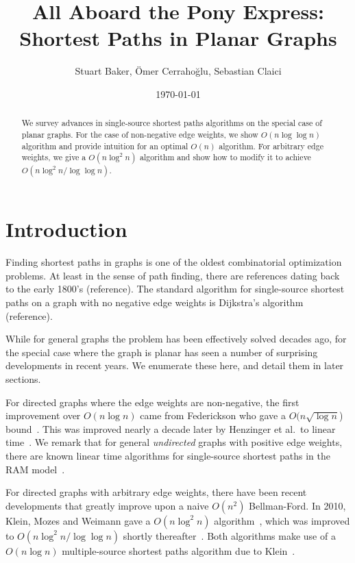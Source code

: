 \documentclass[12pt]{article}
\title{All Aboard the Pony Express:\\ Shortest Paths in Planar Graphs}
\author{Stuart Baker, \"{O}mer Cerraho\u{g}lu, Sebastian Claici}
\date{\today}
\begin{document}
\maketitle

\begin{abstract}
  We survey advances in single-source shortest paths algorithms on the special case of planar graphs. For the case of non-negative edge weights, we show $O(n\log \log n)$ algorithm and provide intuition for an optimal $O(n)$ algorithm. For arbitrary edge weights, we give a $O(n\log^2 n)$ algorithm and show how to modify it to achieve $O(n\log^2 n/\log \log n)$.
\end{abstract}

\section{Introduction}
\label{sec:introduction}

Finding shortest paths in graphs is one of the oldest combinatorial optimization problems. At least in the sense of path finding, there are references dating back to the early 1800's (reference). The standard algorithm for single-source shortest paths on a graph with no negative edge weights is Dijkstra's algorithm (reference).

While for general graphs the problem has been effectively solved decades ago, for the special case where the graph is planar has seen a number of surprising developments in recent years. We enumerate these here, and detail them in later sections.

For directed graphs where the edge weights are non-negative, the first improvement over $O(n\log n)$ came from Federickson who gave a $O(n \sqrt{\log n}$) bound~\cite{federickson1987fast}. This was improved nearly a decade later by Henzinger et al.\ to linear time~\cite{henzinger1997faster}. We remark that for general \emph{undirected} graphs with positive edge weights, there are known linear time algorithms for single-source shortest paths in the RAM model~\cite{thorup1999undirected}.

For directed graphs with arbitrary edge weights, there have been recent developments that greatly improve upon a naive $O(n^2)$ Bellman-Ford. In 2010, Klein, Mozes and Weimann gave a $O(n \log^2 n)$ algorithm~\cite{klein2010shortest}, which was improved to $O(n \log^2 n / \log \log n)$ shortly thereafter~\cite{mozes2010shortest}. Both algorithms make use of a $O(n \log n)$ multiple-source shortest paths algorithm due to Klein~\cite{klein2005multiple}.
\end{document}
